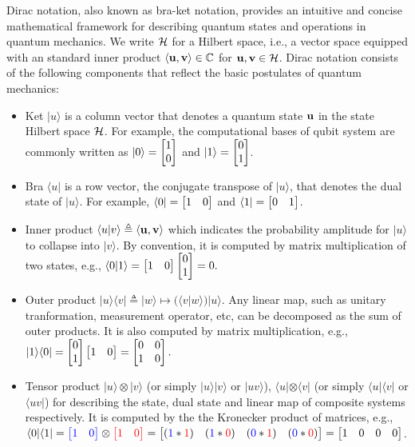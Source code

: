 Dirac notation, also known as bra-ket notation, provides an intuitive
and concise mathematical framework for describing quantum states and
operations in quantum mechanics.  We write ${\mathcal{H}}$ for a Hilbert space,
i.e., a vector space equipped with an standard inner product
$\langle{\mathbf{u}},{\mathbf{v}}\rangle \in {\mathbb{C}}$ for ${\mathbf{u}},{\mathbf{v}}\in{\mathcal{H}}$.  Dirac notation
consists of the following components that reflect the basic postulates
of quantum mechanics:
\begin{itemize}
  \item Ket $|u\rangle$ is a column vector that denotes a quantum state ${\mathbf{u}}$ in the state Hilbert space ${\mathcal{H}}$. For example, the computational bases of qubit system are commonly written as $|0\rangle = \begin{bmatrix}1 \\ 0\end{bmatrix}$ and $|1\rangle = \begin{bmatrix}0 \\ 1\end{bmatrix}$.
  \item Bra $\langle u|$ is a row vector, the conjugate transpose of $|u\rangle$, that denotes the dual state of $|u\rangle$. 
  For example, $\langle 0| = \begin{bmatrix}1 & 0\end{bmatrix}$ and $\langle 1| = \begin{bmatrix}0 & 1\end{bmatrix}$.
  \item Inner product $\langle u|v\rangle \triangleq \langle {\mathbf{u}},{\mathbf{v}}\rangle$ which indicates the probability amplitude for $|u\rangle$ to collapse into $|v\rangle$. 
  By convention, it is computed by matrix multiplication of two states, e.g., 
  $\langle 0|1\rangle = \begin{bmatrix}1 & 0\end{bmatrix} \begin{bmatrix}0 \\ 1\end{bmatrix} = 0.$
  \item Outer product $|u\rangle\langle v| \triangleq |w\rangle \mapsto (\langle v|w\rangle) |u\rangle$. Any linear map, such as unitary tranformation, measurement operator, etc, can be decomposed as the sum of outer products. It is also computed by matrix multiplication, e.g., 
  $|1\rangle\langle 0| = \begin{bmatrix}0 \\ 1\end{bmatrix} \begin{bmatrix}1 & 0\end{bmatrix}  = \begin{bmatrix}0 & 0 \\ 1 & 0\end{bmatrix}.$
  \item Tensor product $|u\rangle\otimes|v\rangle$ (or simply $|u\rangle|v\rangle$ or $|uv\rangle$), $\langle u|\otimes\langle v|$ (or simply $\langle u|\langle v|$ or $\langle uv|$) for describing the state, dual state and linear map of composite systems respectively. It is computed by the the Kronecker product of matrices, e.g., $\langle 0|\langle 1| = {\color{blue}\begin{bmatrix}1 & 0\end{bmatrix}}\otimes {\color{red}\begin{bmatrix}1 & 0\end{bmatrix}} = \begin{bmatrix}({\color{blue}1}*{\color{red}1}) & ({\color{blue}1}*{\color{red}0}) & ({\color{blue}0}*{\color{red}1}) & ({\color{blue}0}*{\color{red}0})\end{bmatrix} = \begin{bmatrix}1&0&0&0\end{bmatrix}$.
\end{itemize}

